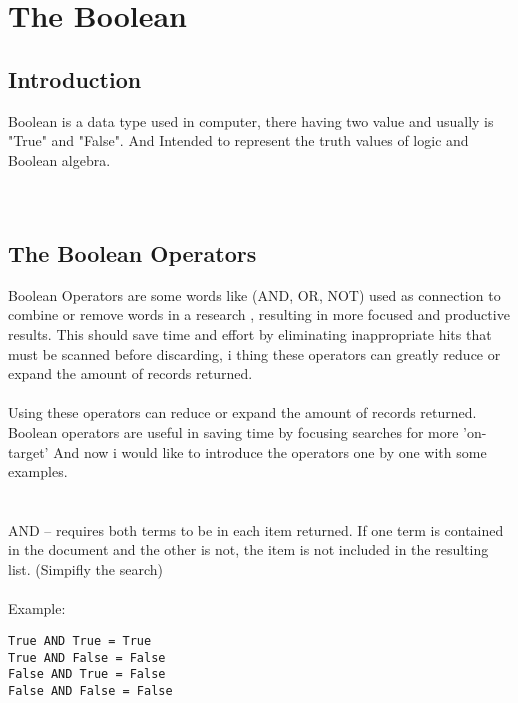 \chapter{The Boolean}

\section{Introduction}

 Boolean is a data type used in computer, there having two value and usually is "True" and "False".
 And Intended to represent the truth values of logic and Boolean algebra.\\ \ \\ \ \\

\section{The Boolean Operators}

Boolean Operators are some words like (AND, OR, NOT) used as
connection to combine or remove words in a research , resulting in more focused and
productive results. This should save time and effort by eliminating inappropriate hits that
must be scanned before discarding, i thing these operators can greatly 
reduce or expand the amount of records returned.\\ \ \\

\noindent Using these operators can reduce or expand the amount of records returned.
Boolean operators are useful in saving time by focusing searches for more 'on-target'
And now i would like to introduce the operators one by one with some examples.\\ \ \\ \ \\

AND -- requires both terms to be in each item returned. If one term is contained in the
document and the other is not, the item is not included in the resulting list. (Simpifly the
search)\\ \ \\

\noindent Example:
\begin{verbatim}
True AND True = True
True AND False = False
False AND True = False
False AND False = False
\end{verbatim}\\ \ \\
\ \\ \ \\

